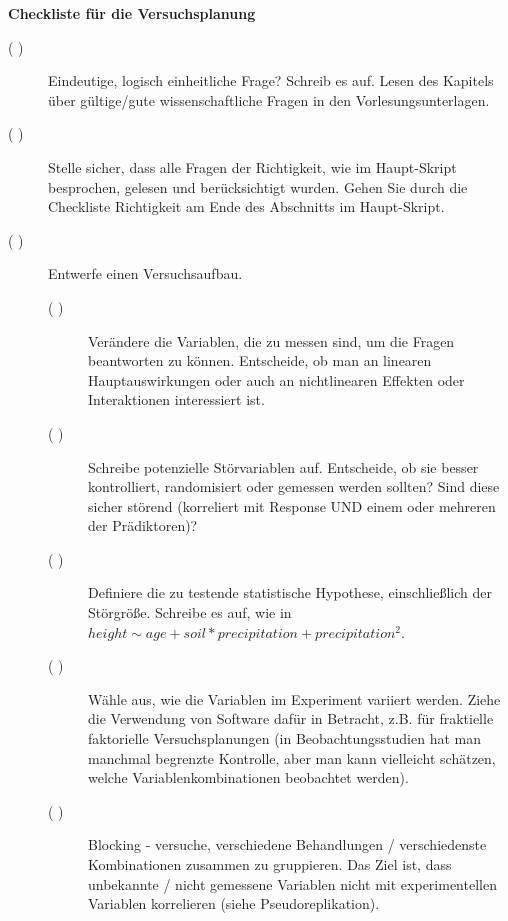 \documentclass[a4paper,twoside]{tufte-book}\usepackage[]{graphicx}\usepackage[]{color}
\begin{document}
\newpage
\begin{mdframed}
    
\textbf{Checkliste für die Versuchsplanung}

\begin{description}

\item[( )] Eindeutige, logisch einheitliche Frage? Schreib es auf. Lesen des Kapitels über gültige/gute wissenschaftliche Fragen in den Vorlesungsunterlagen.

\item[( )] Stelle sicher, dass alle Fragen der Richtigkeit, wie im Haupt-Skript besprochen, gelesen und berücksichtigt wurden. Gehen Sie durch die Checkliste Richtigkeit am Ende des Abschnitts im Haupt-Skript.

\item[( )] Entwerfe einen Versuchsaufbau.

  \begin{description}

  \item[( )] Verändere die Variablen, die zu messen sind, um die Fragen beantworten zu können. Entscheide, ob man an linearen Hauptauswirkungen oder auch an nichtlinearen Effekten oder Interaktionen interessiert ist.
  
  \item[( )] Schreibe potenzielle Störvariablen auf. Entscheide, ob sie besser kontrolliert, randomisiert oder gemessen werden sollten? Sind diese sicher störend (korreliert mit Response UND einem oder mehreren der Prädiktoren)?
  
  \item[( )] Definiere die zu testende statistische Hypothese, einschließlich der Störgröße. Schreibe es auf, wie in $height  \sim age + soil * precipitation + precipitation^2$. 
  
  \item[( )] Wähle aus, wie die Variablen im Experiment variiert werden. Ziehe die Verwendung von Software dafür in Betracht, z.B. für fraktielle faktorielle Versuchsplanungen (in Beobachtungsstudien hat man manchmal begrenzte Kontrolle, aber man kann vielleicht schätzen, welche Variablenkombinationen beobachtet werden).
  
  \item[( )] Blocking - versuche, verschiedene Behandlungen / verschiedenste Kombinationen zusammen zu gruppieren. Das Ziel ist, dass unbekannte / nicht gemessene Variablen nicht mit experimentellen Variablen korrelieren (siehe Pseudoreplikation).
  

\end{description}
\end{description}
\end{mdframed}
\end{document}
